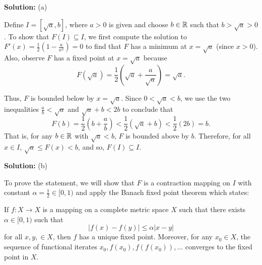 \documentclass{article}
\begin{document}
\textbf{Solution:} (a)

Define $I = [\sqrt{a}, b]$, where $a>0$ is given and choose $b\in\mathbb R$ such that $b>\sqrt{a}>0$. To show that $F(I)\subseteq I$, we first compute the solution to $F'(x) = \frac{1}{2}\left(1 - \frac{a}{x^2}\right) = 0$ to find that $F$ has a minimum at $x = \sqrt{a}$ (since $x>0$). Also, observe $F$ has a fixed point at $x = \sqrt{a}$ because
	\[F(\sqrt{a}) = \frac{1}{2}\left(\sqrt{a} + \frac{a}{\sqrt{a}}\right) = \sqrt{a}.\]
	
Thus, $F$ is bounded below by $x = \sqrt{a}$. Since $0<\sqrt{a}<b$, we use the two inequalities $\frac{a}{b}< \sqrt{a}$ and $\sqrt{a}+b < 2b$ to conclude that
	\[F(b) = \frac{1}{2}\left(b + \frac{a}{b}\right) < \frac{1}{2}(\sqrt{a} + b) < \frac{1}{2}(2b) = b. \]
That is, for any $b\in\mathbb R$ with $\sqrt{a}<b$, $F$ is bounded above by $b$. Therefore, for all $x\in I$, $\sqrt{a} \leq F(x) < b$, and so, $F(I) \subseteq I$.


\textbf{Solution:} (b) 

To prove the statement, we will show that $F$ is a contraction mapping on $I$ with constant $\alpha = \frac{1}{2} \in [0, 1)$ and apply the Banach fixed point theorem which states:

If $f: X\to X$ is a mapping on a complete metric space $X$ such that there exists $\alpha \in [0,1)$ such that 
\[|f(x) - f(y)|\leq \alpha |x-y|\]
for all $x,y,\in X$, then $f$ has a unique fixed point. Moreover, for any $x_0\in X$, the sequence of functional iterates $x_0, f(x_0), f(f(x_0)),\dots$ converges to the fixed point in $X$. 
\end{document}
